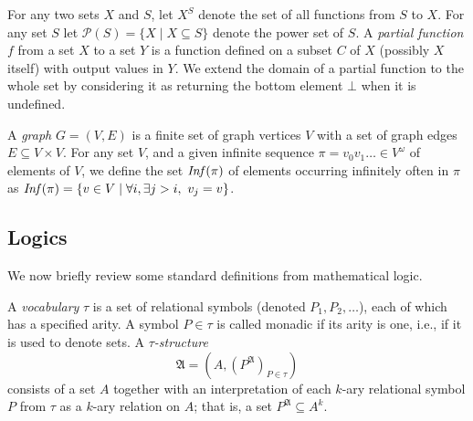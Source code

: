 \documentclass[a4paper,UKenglish,cleveref, autoref, thm-restate]{lipics-v2021}
\begin{document}
 For any two sets $X$ and $S$, let $X^S$ denote the set of all functions from $S$ to $X$.
For any set $S$ let 
$\mathcal{P}(S) = \{ X \mid X \subseteq S \}$
denote the power set of $S$.
%
A {\em partial function} $f$ from a set $X$ to a set $Y$ is a function defined on a subset $C$ of $X$ (possibly $X$ itself) with output values in $Y$. We extend the domain of a partial function to the whole set
by considering it as returning the bottom element $\bot$ when it is undefined.




A {\em graph} $G=(V,E)$ is a finite set of graph vertices $V$ with a set of graph edges $E \subseteq V \times V$. 
For any set $V$, and a given infinite sequence $\pi = v_0 v_1 \ldots \in V^\omega$ of elements of $V$, we define the set 
$\text{\textit{Inf}}(\pi)$ of elements occurring infinitely often in $\pi$ as
$\text{\textit{Inf}}(\pi) = \{ v \in V \mid \forall i, \exists j > i, ~ v_j = v \}$. 



		\iffalse


\subsection{Logics}

We now brieﬂy review some standard deﬁnitions from mathematical logic.

\begin{samepage}
\begin{definition}
 A {\em vocabulary} $\tau$ is a set of relational symbols (denoted $P_1, P_2, \ldots $), each of which has a specified
 arity. A symbol $P \in \tau$ is called monadic if its arity is one, i.e., if it is used to
 denote sets.
%
A {\em $\tau$-structure} %
%
$$ \mathfrak{A} = (A,	( P^{\mathfrak{A}} )_{P \in \tau})$$
%
consists of a set $A$ together with an interpretation of
 each $k$-ary relational symbol $P$ from $\tau$ as a $k$-ary relation on $A$; that is, a
set $P^{\mathfrak{A}} \subseteq A^k$.
%
\end{definition}
\end{samepage}
\end{document}
